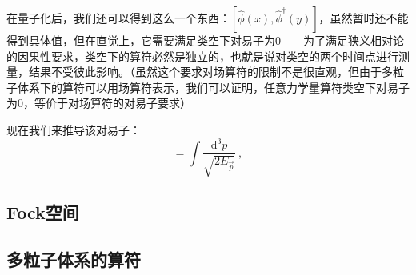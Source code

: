 在量子化后，我们还可以得到这么一个东西：$[\hat{\phi}(x),\hat{\phi}^\dagger(y)]$，虽然暂时还不能得到具体值，但在直觉上，它需要满足类空下对易子为0——为了满足狭义相对论的因果性要求，类空下的算符必然是独立的，也就是说对类空的两个时间点进行测量，结果不受彼此影响。（虽然这个要求对场算符的限制不是很直观，但由于多粒子体系下的算符可以用场算符表示，我们可以证明，任意力学量算符类空下对易子为0，等价于对场算符的对易子要求）

现在我们来推导该对易子：
\begin{equation}
[\hat{\phi}(x),\hat{\phi}^\dagger(y)]=\int\frac{\mathrm d^3p}{\sqrt{2 E_\vec p}}~,
\end{equation}






\subsection{Fock空间}
\subsection{多粒子体系的算符}


